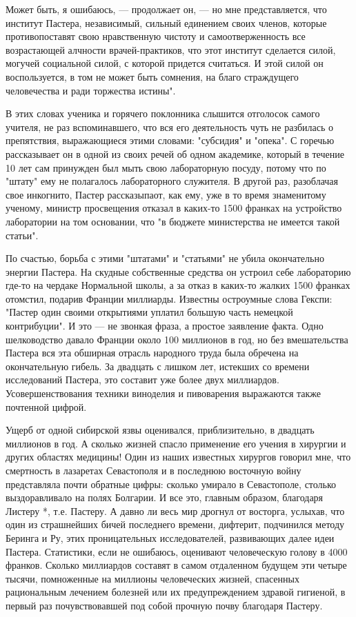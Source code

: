 Может быть, я ошибаюсь, --- продолжает он, --- но мне представляется, что
институт Пастера, независимый, сильный единением своих членов, которые
противопоставят свою нравственную чистоту и самоотверженность все
возрастающей алчности врачей-практиков, что этот институт сделается
силой, могучей социальной силой, с которой придется считаться. И этой
силой он воспользуется, в том не может быть сомнения, на благо
страждущего человечества и ради торжества истины".

В этих словах  ученика и горячего  поклонника слышится отголосок  самого
учителя,  не  раз  вспоминавшего,  что  вся  его  деятельность  чуть  не
разбилась  о  препятствия,  выражающиеся  этими  словами:  "субсидия"  и
"опека". С  горечью рассказывает  он в  одной из  своих речей  об  одном
академике, который  в  течение  10  лет  сам  принужден  был  мыть  свою
лабораторную  посуду,   потому  что   по  "штату"   ему  не   полагалось
лабораторного служителя. В другой раз, разоблачая свое инкогнито, Пастер
рассказыпаот, как  ему,  уже в  то  время знаменитому  ученому,  министр
просвещения отказал в каких-то 1500 франках на устройство лаборатории на
том основании, что "в бюджете министерства не имеется такой статьи".

По счастью, борьба с этими "штатами" и "статьями" не убила  окончательно
энергии  Пастера.  На  скудные  собственные  средства  он  устроил  себе
лабораторию где-то на чердаке  Нормальной школы, а  за отказ в  каких-то
жалких  1500  франках  отомстил,  подарив  Франции  миллиарды.  Известны
остроумные слова Гекспи: "Пастер один своими открытиями уплатил  большую
часть немецкой  контрибуции".  И  это  --- не  звонкая  фраза,  а  простое
заявление факта. Одно шелководство давало Франции около 100 миллионов  в
год, но без  вмешательства Пастера  вся эта  обширная отрасль  народного
труда была обречена на окончательную  гибель. За двадцать с лишком  лет,
истекших со времени  исследований Пастера, это  составит уже более  двух
миллиардов.   Усовершенствования   техники   виноделия   и   пивоварения
выражаются также почтенной цифрой.

Ущерб от  одной сибирской  язвы оценивался,  приблизительно, в  двадцать
миллионов в  год.  А  сколько  жизней спасло  применение  его  учения  в
хирургии и других  областях медицины! Один  из наших известных  хирургов
говорил мне,  что  смертность  в лазаретах  Севастополя  и  в  последнюю
восточную войну  представляла почти  обратные цифры:  сколько умирало  в
Севастополе, столько  выздоравливало  на  полях  Болгарии.  И  все  это,
главным образом, благодаря Листеру *, т.е. Пастеру. А давно ли весь  мир
дрогнул от восторга, услыхав, что  один из страшнейших бичей  последнего
времени, дифтерит, подчинился методу  Беринга и Ру, этих  проницательных
исследователей, развивающих  далее  идеи Пастера.  Статистики,  если  не
ошибаюсь,  оценивают  человеческую  голову   в  4000  франков.   Сколько
миллиардов составят  в  самом  отдаленном  будущем  эти  четыре  тысячи,
помноженные на  миллионы  человеческих  жизней,  спасенных  рациональным
лечением болезней или их предупреждением здравой гигиеной, в первый  раз
почувствовавшей под собой прочную почву благодаря Пастеру.

